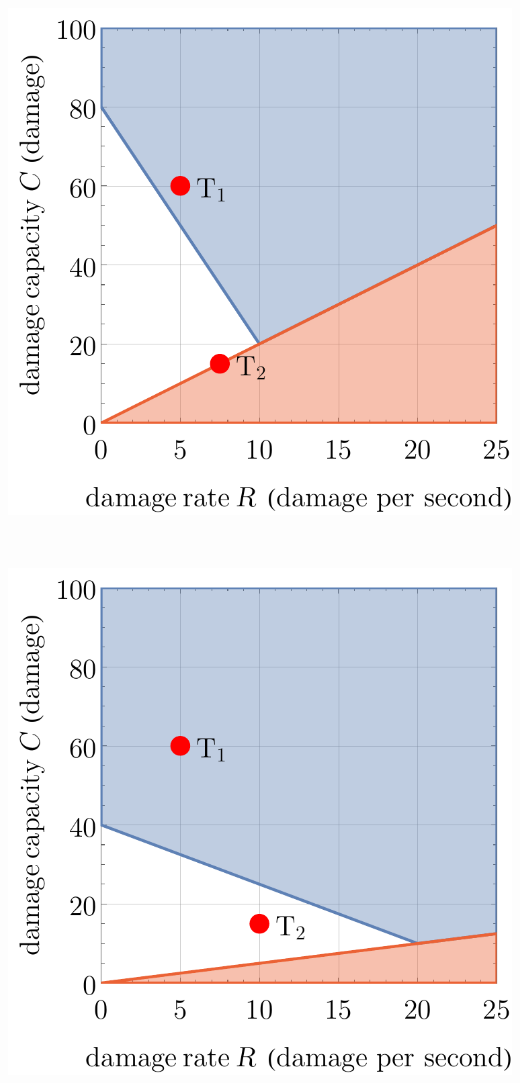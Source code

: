 \begin{center}
\begin{minipage}{.33\textwidth}
        \label{fig:model-3-h20}
    \end{minipage}%
    \begin{minipage}{.33\textwidth}
        \centering
        \includegraphics[width=0.95\linewidth]{img/model3 s2.pdf}
        \label{fig:model-3-s2}
    \end{minipage}\\
    \begin{minipage}{.33\textwidth}
        \centering
        \includegraphics[width=0.95\linewidth]{img/model3 g0.5.pdf}

\end{minipage}
\end{center}
